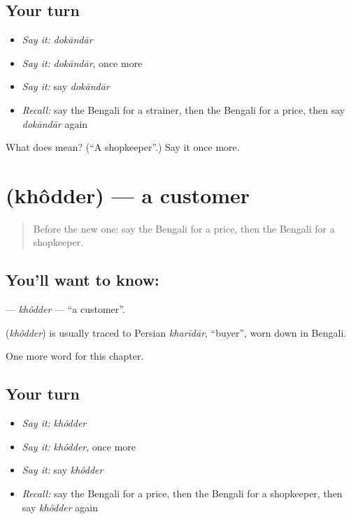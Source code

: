 \subsection*{Your turn}
\begin{itemize}
\raggedright
  \item \emph{Say it:} \emph{dokāndār}
  \item \emph{Say it:} \emph{dokāndār}, once more
  \item \emph{Say it:} say \emph{dokāndār}
  \item \emph{Recall:} say the Bengali for a strainer, then the Bengali for a price, then say \emph{dokāndār} again
\end{itemize}

\begin{tcolorbox}[breakable,colback=teal!4,colframe=teal!35!black,title={Before you move on}]
What does  mean? (\textquotedblleft{}A shopkeeper\textquotedblright{}.) Say it once more.
\end{tcolorbox}
\section[\texorpdfstring{\bn{খদ্দের} (khôdder)}{খদ্দের (khôdder)}]{ (khôdder) — a customer}

\label{lesson:BN-C207-khodder}



\begin{quote}
Before the new one: say the Bengali for a price, then the Bengali for a shopkeeper.
\end{quote}

\subsection*{You'll want to know: }
\textbf{} — \emph{khôdder} — \textquotedblleft{}a customer\textquotedblright{}.

\begin{cousinweb}
\textbf{} (\emph{khôdder}) is usually traced to Persian \emph{kharīdār}, \textquotedblleft{}buyer\textquotedblright{}, worn down in Bengali.
\end{cousinweb}

\begin{grammarlens}[title={What you've built}]
One more word for this chapter.
\end{grammarlens}

\subsection*{Your turn}
\begin{itemize}
\raggedright
  \item \emph{Say it:} \emph{khôdder}
  \item \emph{Say it:} \emph{khôdder}, once more
  \item \emph{Say it:} say \emph{khôdder}
  \item \emph{Recall:} say the Bengali for a price, then the Bengali for a shopkeeper, then say \emph{khôdder} again
\end{itemize}

